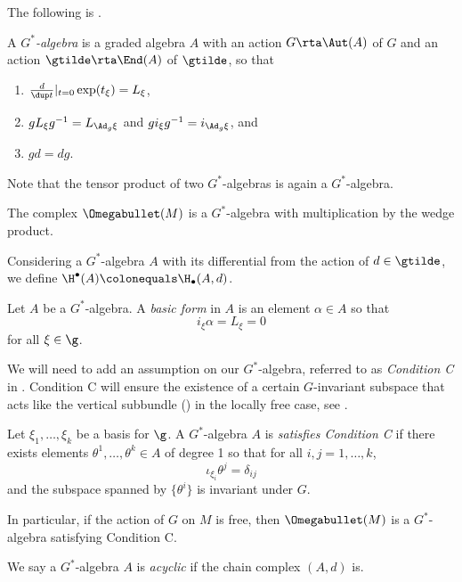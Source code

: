 The following is \cite[Definition 2.3.1]{MR1689252}. 
\begin{definition}
	A \emph{$G^*$-algebra} is a graded algebra $A$ with an action $G\rta\Aut(A)$ of $G$ and an action $\gtilde\rta\End(A)$ of $\gtilde$, so that 
	\begin{enumerate}[(1)]
		\item $\frac{d}{\dup t}\vert_{t=0}\exp(t_\xi)=L_\xi$,
		\item $gL_\xi g^{-1}=L_{\Ad_g\xi}$ and $gi_\xi g^{-1}=i_{\Ad_g\xi}$, and
		\item $gd=dg$.
	\end{enumerate}
\end{definition}

Note that the tensor product of two $G^*$-algebras is again a $G^*$-algebra. %

\begin{ex}
	The complex $\Omegabullet(M)$ is a $G^*$-algebra with multiplication by the wedge product.
\end{ex}

\noindent Considering a $G^*$-algebra $A$ with its differential from the action of $d\in\gtilde$, 
we define ${\H^\bullet(A)\colonequals \H_\bullet(A,d)}$. 

\begin{definition}
Let $A$ be a $G^*$-algebra. 
A \emph{basic form} in $A$ is an element $\alpha\in A$ so that 
\[i_\xi\alpha=L_\xi=0\]
for all $\xi\in\g $. 
\end{definition}

We will need to add an assumption on our $G^*$-algebra, referred to as \emph{Condition C} in \cite[\S 2.3.4]{MR1689252}. 
Condition C will ensure the existence of a certain $G$-invariant subspace that acts like the vertical subbundle () in the locally free case, see \cite[Definition 2.3.3]{MR1689252}. 

\begin{definition}
	Let $\xi_1,\dots,\xi_k$ be a basis for $\g $. 
	A $G^*$-algebra $A$ is \emph{satisfies Condition C} if there exists elements $\theta^1,\dots,\theta^k\in A$ of degree 1 so that for all $i,j=1,\dots, k$,
	\[\iota_{\xi_i}\theta^{j}=\delta_{ij}\]
	and the subspace spanned by $\{\theta^i\}$ is invariant under $G$.
\end{definition}

In particular, if the action of $G$ on $M$ is free, then $\Omegabullet(M)$ is a $G^*$-algebra satisfying Condition C.


We say a $G^*$-algebra $A$ is \emph{acyclic} if the chain complex $(A,d)$ is.

